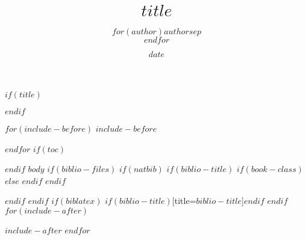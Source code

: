 \documentclass[fontsize=11pt]{article}
\title{$title$}
\author{$for(author)$$author$$sep$\\$endfor$}
\date{$date$}
\begin{document}
		    $if(title)$
		    \maketitle
		    $endif$

		    $for(include-before)$
		    $include-before$

		    $endfor$
		    $if(toc)$
		    \tableofcontents

		    $endif$
		    $body$
		    $if(biblio-files)$
		    $if(natbib)$
		    $if(biblio-title)$
		    $if(book-class)$
		    \renewcommand\bibname{$biblio-title$}
		    $else$
		    \renewcommand\refname{$biblio-title$}
		    $endif$
		    $endif$
		    
		    $endif$
		    $endif$
		    $if(biblatex)$
		    \printbibliography$if(biblio-title)$[title=$biblio-title$]$endif$
		    $endif$
		    $for(include-after)$

		    $include-after$
		    $endfor$

		    
\end{document}
